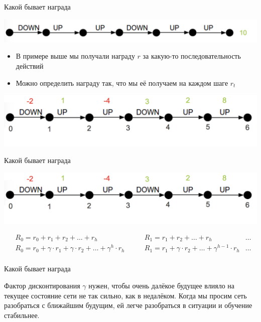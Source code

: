 \documentclass[notes,12pt, aspectratio=169]{beamer}
\begin{document}
\begin{frame}{Какой бывает награда}
\begin{center}
	\includegraphics[width=.7\linewidth]{states.png}
\end{center}
\begin{itemize}
	\item В примере выше мы получали награду $r$ за какую-то последовательность действий
	\item Можно определить награду так, что мы её получаем на каждом шаге $r_t$
\end{itemize}
\begin{center}
	\includegraphics[width=.7\linewidth]{states_1.png}
\end{center}
\end{frame}


\begin{frame}{Какой бывает награда}
\begin{center}
	\includegraphics[width=.7\linewidth]{states_1.png}
\end{center}
\begin{equation*}
\begin{aligned}
&R_0 = r_0 + r_1 + r_2 + \ldots + r_{h}  & \qquad  R_1 = r_1 + r_2 + \ldots + r_{h} & \ldots \\
&R_0 = r_0 + \gamma \cdot r_1 + \gamma \cdot r_2 + \ldots +  \gamma^h \cdot r_{h}  & \qquad  R_1 = r_1 + \gamma \cdot r_2 + \ldots + \gamma^{h-1} \cdot r_{h} & \ldots \\
\end{aligned} 
\end{equation*}
\end{frame}

\begin{frame}{Какой бывает награда}

\alert{Фактор дисконтирования $\gamma$} нужен, чтобы очень далёкое будущее влияло на текущее состояние сети не так сильно, как в недалёком. Когда мы просим сеть разобраться с ближайшим будущим, ей легче разобраться в ситуации и обучение стабильнее. 
\end{frame}
\end{document}
